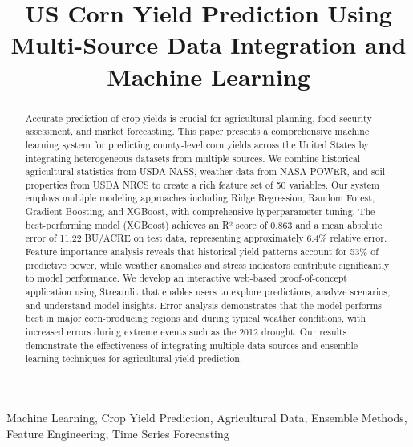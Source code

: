 \documentclass[conference]{IEEEtran}
\begin{document}
\title{US Corn Yield Prediction Using Multi-Source Data Integration and Machine Learning}

\author{
}

\maketitle

\begin{abstract}
Accurate prediction of crop yields is crucial for agricultural planning, food security assessment, and market forecasting. This paper presents a comprehensive machine learning system for predicting county-level corn yields across the United States by integrating heterogeneous datasets from multiple sources. We combine historical agricultural statistics from USDA NASS, weather data from NASA POWER, and soil properties from USDA NRCS to create a rich feature set of 50 variables. Our system employs multiple modeling approaches including Ridge Regression, Random Forest, Gradient Boosting, and XGBoost, with comprehensive hyperparameter tuning. The best-performing model (XGBoost) achieves an R² score of 0.863 and a mean absolute error of 11.22 BU/ACRE on test data, representing approximately 6.4\% relative error. Feature importance analysis reveals that historical yield patterns account for 53\% of predictive power, while weather anomalies and stress indicators contribute significantly to model performance. We develop an interactive web-based proof-of-concept application using Streamlit that enables users to explore predictions, analyze scenarios, and understand model insights. Error analysis demonstrates that the model performs best in major corn-producing regions and during typical weather conditions, with increased errors during extreme events such as the 2012 drought. Our results demonstrate the effectiveness of integrating multiple data sources and ensemble learning techniques for agricultural yield prediction.
\end{abstract}

\begin{IEEEkeywords}
Machine Learning, Crop Yield Prediction, Agricultural Data, Ensemble Methods, Feature Engineering, Time Series Forecasting
\end{IEEEkeywords}
\end{document}
